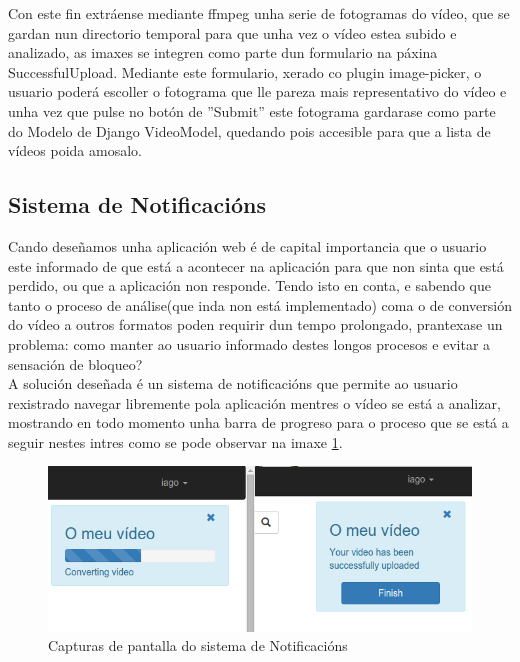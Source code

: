         Con este fin extráense mediante ffmpeg unha serie de fotogramas do vídeo, que se gardan nun
        directorio temporal para que unha vez o vídeo estea subido e analizado, as imaxes se integren 
        como parte dun formulario na páxina SuccessfulUpload. Mediante este formulario, xerado co plugin
        image-picker\cite{ImagePickerPage}, o usuario poderá escoller o fotograma que lle pareza mais
        representativo do vídeo e unha vez que pulse no botón de ''Submit'' este fotograma gardarase
        como parte do Modelo de Django VideoModel, quedando pois accesible para que a lista de vídeos 
        poida amosalo.
        
    \subsection{Sistema de Notificacións}
    
        Cando deseñamos unha aplicación web é de capital importancia que o usuario este informado de que está
        a acontecer na aplicación para que non sinta que está perdido, ou que a aplicación non responde. Tendo
        isto en conta, e sabendo que tanto o proceso de análise(que inda non está implementado)
        coma o de conversión do vídeo a outros 
        formatos poden requirir dun tempo prolongado, prantexase un problema: como manter ao usuario informado
        destes longos procesos e evitar a sensación de bloqueo?\\
        
        A solución deseñada é un sistema de notificacións que permite ao usuario rexistrado navegar libremente
        pola aplicación mentres o vídeo se está a analizar, mostrando en todo momento unha barra de progreso
        para o proceso que se está a seguir nestes intres como se pode observar na imaxe 
        \ref{fig:Notificacions}.
        
        \begin{figure}[htp]
        \begin{center}
            \includegraphics[scale=0.5]{figures/Notificacions.png}
            \caption{Capturas de pantalla do sistema de Notificacións}
        \label{fig:Notificacions}
        \end{center}
        \end{figure}
        
